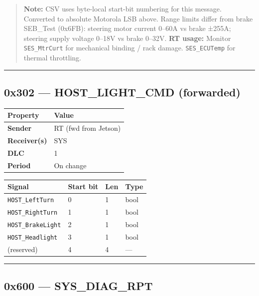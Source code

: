 \documentclass[12pt,a4paper,oneside]{report}
\begin{document}
\begin{quote}
\textbf{Note:} CSV uses byte-local start-bit numbering for this message.
Converted to absolute Motorola LSB above. Range limits differ from brake
SEB\_Test (0x6FB): steering motor current 0--60A vs brake ±255A; steering supply
voltage 0--18V vs brake 0--32V. \textbf{RT usage:} Monitor \texttt{SES\_MtrCurt}
for mechanical binding / rack damage. \texttt{SES\_ECUTemp} for thermal
throttling.
\end{quote}

\begin{center}\rule{0.5\linewidth}{0.5pt}\end{center}

\subsection{0x302 --- HOST\_LIGHT\_CMD
(forwarded)}\label{x302-host_light_cmd-forwarded}

\begin{longtable}[]{@{}ll@{}}
\toprule\noalign{}
Property & Value \\
\midrule\noalign{}
\endhead
\bottomrule\noalign{}
\endlastfoot
\textbf{Sender} & RT (fwd from Jetson) \\
\textbf{Receiver(s)} & SYS \\
\textbf{DLC} & 1 \\
\textbf{Period} & On change \\
\end{longtable}

\begin{longtable}[]{@{}llll@{}}
\toprule\noalign{}
Signal & Start bit & Len & Type \\
\midrule\noalign{}
\endhead
\bottomrule\noalign{}
\endlastfoot
\texttt{HOST\_LeftTurn} & 0 & 1 & bool \\
\texttt{HOST\_RightTurn} & 1 & 1 & bool \\
\texttt{HOST\_BrakeLight} & 2 & 1 & bool \\
\texttt{HOST\_Headlight} & 3 & 1 & bool \\
(reserved) & 4 & 4 & --- \\
\end{longtable}

\begin{center}\rule{0.5\linewidth}{0.5pt}\end{center}

\subsection{0x600 --- SYS\_DIAG\_RPT}\label{x600-sys_diag_rpt}
\end{document}
